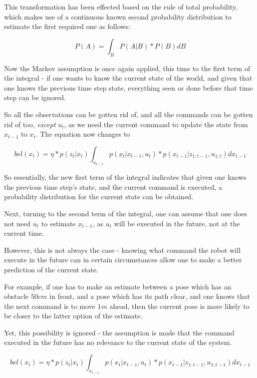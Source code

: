 \documentclass[a4paper]{article}
\begin{document}
This transformation has been effected based on the rule of total probability, which makes use of a continuous known second probability distribution to estimate the first required one as follows:

\begin{equation*}
    P(A) = \int_B P(A|B) * P(B) dB
\end{equation*}

Now the Markov assumption is once again applied, this time to the first term of the integral - if one wants to know the current state of the world, and given that one knows the previous time step state, everything seen or done before that time step can be ignored.

So all the observations can be gotten rid of, and all the commands can be gotten rid of too, \textit{except} $u_t$, as we need the current command to update the state from $x_{t-1}$ to $x_t$. The equation now changes to

\begin{equation*}
    bel(x_t) = \eta * p(z_t | x_t)  \int_{x_{t-1}} p(x_t | x_{t-1}, u_t) * p(x_{t-1} | z_{1:t-1}, u_{1:t}) dx_{t-1}
\end{equation*}

So essentially, the new first term of the integral indicates that given one knows the previous time step's state, and the current command is executed, a probability distribution for the current state can be obtained.

Next, turning to the second term of the integral, one can assume that one does not need $u_t$ to estimate $x_{t-1}$, as $u_t$ will be executed in the future, not at the current time.

However, this is not always the case - knowing what command the robot will execute in the future can in certain circumstances allow one to make a better prediction of the current state. 

For example, if one has to make an estimate between a pose which has an obstacle $50 cm$ in front, and a pose which has its path clear, and one knows that the next command is to move $ 1 m$ ahead, then the current pose is more likely to be closer to the latter option of the estimate. 

Yet, this possibility is ignored - the assumption is made that the command executed in the future has no relevance to the current state of the system.

\begin{equation*}
    bel(x_t) = \eta * p(z_t | x_t)  \int_{x_{t-1}} p(x_t | x_{t-1}, u_t) * p(x_{t-1} | z_{1:t-1}, u_{1:t-1}) dx_{t-1}
\end{equation*}
\end{document}
